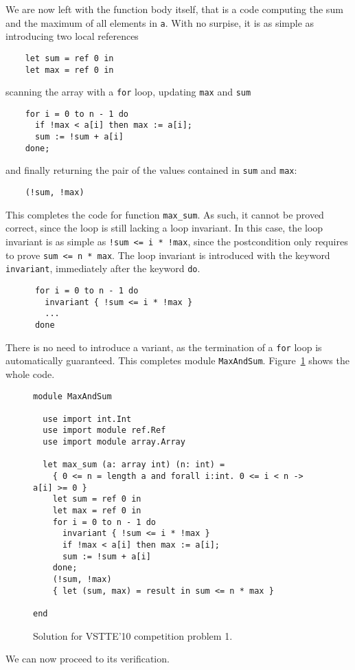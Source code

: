 We are now left with the function body itself, that is a code
computing the sum and the maximum of all elements in \texttt{a}. With
no surpise, it is as simple as introducing two local references
\begin{verbatim}
    let sum = ref 0 in
    let max = ref 0 in
\end{verbatim}
scanning the array with a \texttt{for} loop, updating \texttt{max}
and \texttt{sum}
\begin{verbatim}
    for i = 0 to n - 1 do
      if !max < a[i] then max := a[i];
      sum := !sum + a[i]
    done;
\end{verbatim}
and finally returning the pair of the values contained in \texttt{sum}
and \texttt{max}:
\begin{verbatim}
    (!sum, !max)
\end{verbatim}
This completes the code for function \texttt{max\_sum}.
As such, it cannot be proved correct, since the loop is still lacking
a loop invariant. In this case, the loop invariant is as simple as
\verb|!sum <= i * !max|, since the postcondition only requires to prove
\verb|sum <= n * max|. The loop invariant is introduced with the
keyword \texttt{invariant}, immediately after the keyword \texttt{do}.
\begin{verbatim}
      for i = 0 to n - 1 do
        invariant { !sum <= i * !max }
        ...
      done
\end{verbatim}
There is no need to introduce a variant, as the termination of a
\texttt{for} loop is automatically guaranteed. 
This completes module \texttt{MaxAndSum}.
Figure~\ref{fig:MaxAndSum} shows the whole code.
\begin{figure}
  \centering
\begin{verbatim}
module MaxAndSum

  use import int.Int
  use import module ref.Ref
  use import module array.Array

  let max_sum (a: array int) (n: int) =
    { 0 <= n = length a and forall i:int. 0 <= i < n -> a[i] >= 0 }
    let sum = ref 0 in
    let max = ref 0 in
    for i = 0 to n - 1 do
      invariant { !sum <= i * !max }
      if !max < a[i] then max := a[i];
      sum := !sum + a[i]
    done;
    (!sum, !max)
    { let (sum, max) = result in sum <= n * max }

end
\end{verbatim}
\hrulefill
  \caption{Solution for VSTTE'10 competition problem 1.}
  \label{fig:MaxAndSum}
\end{figure}
We can now proceed to its verification.
